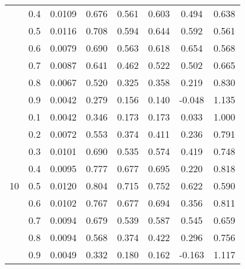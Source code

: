 \documentclass[11pt,a4paper]{report}
\begin{document}
\begin{longtable}{ | c | c || c | c | c | c | c | c | }
 & 0.4 & 0.0109 & 0.676 & 0.561 & 0.603 & 0.494 & 0.638 \\
 & 0.5 & 0.0116 & 0.708 & 0.594 & 0.644 & 0.592 & 0.561 \\
 & 0.6 & 0.0079 & 0.690 & 0.563 & 0.618 & 0.654 & 0.568 \\
 & 0.7 & 0.0087 & 0.641 & 0.462 & 0.522 & 0.502 & 0.665 \\
 & 0.8 & 0.0067 & 0.520 & 0.325 & 0.358 & 0.219 & 0.830 \\
 & 0.9 & 0.0042 & 0.279 & 0.156 & 0.140 & -0.048 & 1.135 \\
 \hline
\multirow{9}{*}{10} & 0.1 & 0.0042 & 0.346 & 0.173 & 0.173 & 0.033 & 1.000 \\
 & 0.2 & 0.0072 & 0.553 & 0.374 & 0.411 & 0.236 & 0.791 \\
 & 0.3 & 0.0101 & 0.690 & 0.535 & 0.574 & 0.419 & 0.748 \\
 & 0.4 & 0.0095 & 0.777 & 0.677 & 0.695 & 0.220 & 0.818 \\
 & 0.5 & 0.0120 & 0.804 & 0.715 & 0.752 & 0.622 & 0.590 \\
 & 0.6 & 0.0102 & 0.767 & 0.677 & 0.694 & 0.356 & 0.811 \\
 & 0.7 & 0.0094 & 0.679 & 0.539 & 0.587 & 0.545 & 0.659 \\
 & 0.8 & 0.0094 & 0.568 & 0.374 & 0.422 & 0.296 & 0.756 \\
 & 0.9 & 0.0049 & 0.332 & 0.180 & 0.162 & -0.163 & 1.117 \\
 \hline
\hline
\end{longtable}
\end{document}
